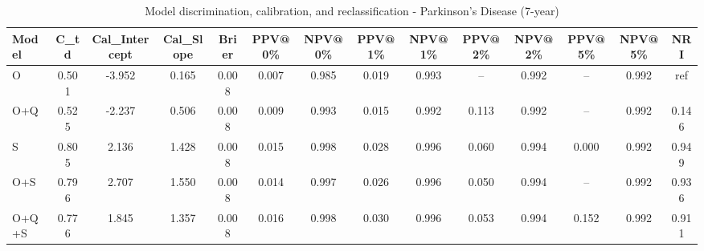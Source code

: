 \begin{table}[htbp]
\centering
\small
\caption{Model discrimination, calibration, and reclassification - Parkinson's Disease (7-year)}
\label{tab:perf_pd_7y}
\begin{tabular}{lccccccccccccc}
\toprule
Model & C\_td & Cal\_Intercept & Cal\_Slope & Brier & PPV@0\% & NPV@0\% & PPV@1\% & NPV@1\% & PPV@2\% & NPV@2\% & PPV@5\% & NPV@5\% & NRI \\
\midrule
O & 0.501 & -3.952 & 0.165 & 0.008 & 0.007 & 0.985 & 0.019 & 0.993 & -- & 0.992 & -- & 0.992 & ref \\
O+Q & 0.525 & -2.237 & 0.506 & 0.008 & 0.009 & 0.993 & 0.015 & 0.992 & 0.113 & 0.992 & -- & 0.992 & 0.146 \\
S & 0.805 & 2.136 & 1.428 & 0.008 & 0.015 & 0.998 & 0.028 & 0.996 & 0.060 & 0.994 & 0.000 & 0.992 & 0.949 \\
O+S & 0.796 & 2.707 & 1.550 & 0.008 & 0.014 & 0.997 & 0.026 & 0.996 & 0.050 & 0.994 & -- & 0.992 & 0.936 \\
O+Q+S & 0.776 & 1.845 & 1.357 & 0.008 & 0.016 & 0.998 & 0.030 & 0.996 & 0.053 & 0.994 & 0.152 & 0.992 & 0.911 \\
\bottomrule
\end{tabular}
\end{table}